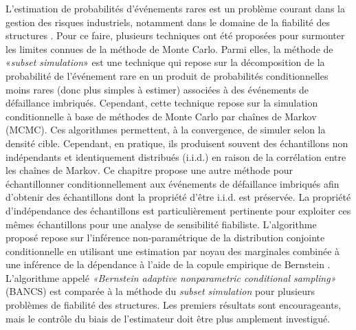 L'estimation de probabilit\'{e}s d'\'{e}v\'{e}nements rares est un problème courant dans la gestion des risques industriels, notamment dans le domaine de la fiabilit\'{e} des structures \citep{MorioBalesdent2015}. 
Pour ce faire, plusieurs techniques ont \'{e}t\'{e} propos\'{e}es pour surmonter les limites connues de la m\'{e}thode de Monte Carlo. 
Parmi elles, la m\'{e}thode de «\textit{subset simulation}» \citep{AuBeck2001} est une technique qui repose sur la d\'{e}composition de la probabilit\'{e} de l'\'{e}v\'{e}nement rare en un produit de probabilit\'{e}s conditionnelles moins rares (donc plus simples à estimer) associ\'{e}es à des \'{e}v\'{e}nements de d\'{e}faillance imbriqu\'{e}s. 
Cependant, cette technique repose sur la simulation conditionnelle à base de m\'{e}thodes de Monte Carlo par chaînes de Markov (MCMC). 
Ces algorithmes permettent, à la convergence, de simuler selon la densit\'{e} cible. 
Cependant, en pratique, ils produisent souvent des \'{e}chantillons non ind\'{e}pendants et identiquement distribu\'{e}s (i.i.d.) en raison de la corr\'{e}lation entre les chaînes de Markov. 
Ce chapitre propose une autre m\'{e}thode pour \'{e}chantillonner conditionnellement aux \'{e}v\'{e}nements de d\'{e}faillance imbriqu\'{e}s afin d'obtenir des \'{e}chantillons dont la propri\'{e}t\'{e} d'être i.i.d. est pr\'{e}serv\'{e}e. 
La propri\'{e}t\'{e} d'ind\'{e}pendance des \'{e}chantillons est particulièrement pertinente pour exploiter ces mêmes \'{e}chantillons pour une analyse de sensibilit\'{e} fiabiliste. 
L'algorithme propos\'{e} repose sur l'inf\'{e}rence non-param\'{e}trique de la distribution conjointe conditionnelle en utilisant une estimation par noyau des marginales combin\'{e}e à une inf\'{e}rence de la d\'{e}pendance à l'aide de la copule empirique de Bernstein \citep{sancetta_satchell_2004}. 
L'algorithme appel\'{e} \textit{«Bernstein adaptive nonparametric conditional sampling»} (BANCS) est compar\'{e}e à la m\'{e}thode du \textit{subset simulation} pour plusieurs problèmes de fiabilit\'{e} des structures. 
Les premiers r\'{e}sultats sont encourageants, mais le contrôle du biais de l'estimateur doit être plus amplement investigu\'{e}. 

